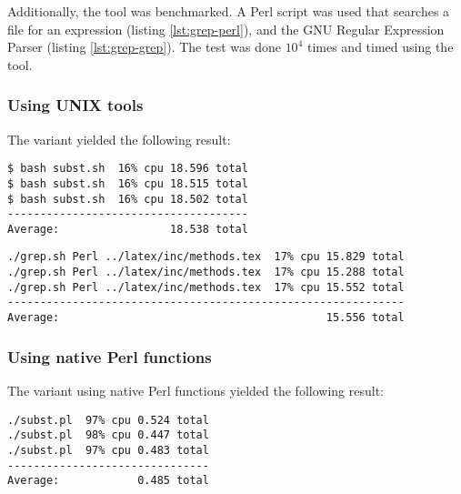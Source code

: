 Additionally, the  tool was benchmarked. A Perl script was used that
searches a file for an expression (listing \ref{lst:grep-perl}), and the GNU
Regular Expression Parser  (listing \ref{lst:grep-grep}). The test
was done $10^4$ times and timed using the  tool.

\subsubsection{Using UNIX tools}


The  variant yielded the following result:

\begin{verbatim}
$ bash subst.sh  16% cpu 18.596 total
$ bash subst.sh  16% cpu 18.515 total
$ bash subst.sh  16% cpu 18.502 total
-------------------------------------
Average:                 18.538 total
\end{verbatim}



\begin{verbatim}
./grep.sh Perl ../latex/inc/methods.tex  17% cpu 15.829 total
./grep.sh Perl ../latex/inc/methods.tex  17% cpu 15.288 total
./grep.sh Perl ../latex/inc/methods.tex  17% cpu 15.552 total
-------------------------------------------------------------
Average:                                         15.556 total
\end{verbatim}

\subsubsection{Using native Perl functions}


The variant using native Perl functions yielded the following result:

\begin{verbatim}
./subst.pl  97% cpu 0.524 total
./subst.pl  98% cpu 0.447 total
./subst.pl  97% cpu 0.483 total
-------------------------------
Average:            0.485 total
\end{verbatim}



